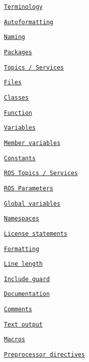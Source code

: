
\begin{DoxyItemize}
\item \href{#terminology}{\tt Terminology}
\item \href{#autoformatting}{\tt Autoformatting}
\item \href{#naming}{\tt Naming}
\begin{DoxyItemize}
\item \href{#packages}{\tt Packages}
\item \href{#topics--services}{\tt Topics / Services}
\item \href{#files}{\tt Files}
\begin{DoxyItemize}
\item \href{#classes}{\tt Classes}
\item \href{#function}{\tt Function}
\end{DoxyItemize}
\item \href{#variables}{\tt Variables}
\begin{DoxyItemize}
\item \href{#member-variables}{\tt Member variables}
\item \href{#constants}{\tt Constants}
\begin{DoxyItemize}
\item \href{#ros-topics--services}{\tt R\+OS Topics / Services}
\item \href{#ros-parameters}{\tt R\+OS Parameters}
\end{DoxyItemize}
\item \href{#global-variables}{\tt Global variables}
\end{DoxyItemize}
\item \href{#namespaces}{\tt Namespaces}
\end{DoxyItemize}
\item \href{#license-statements}{\tt License statements}
\item \href{#formatting}{\tt Formatting}
\begin{DoxyItemize}
\item \href{#line-length}{\tt Line length}
\end{DoxyItemize}
\item \href{#include-guard}{\tt Include guard}
\item \href{#documentation}{\tt Documentation}
\item \href{#comments}{\tt Comments}
\item \href{#text-output}{\tt Text output}
\item \href{#macros}{\tt Macros}
\item \href{#preprocessor-directives}{\tt Preprocessor directives}

\end{DoxyItemize}
